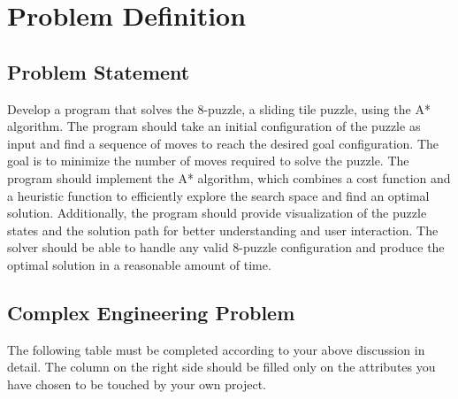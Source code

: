 \documentclass[12pt]{report}
\begin{document}
\section{Problem Definition}

\subsection{Problem Statement}
Develop a program that solves the 8-puzzle, a sliding tile puzzle, using the A* algorithm. The program should take an initial configuration of the puzzle as input and find a sequence of moves to reach the desired goal configuration. The goal is to minimize the number of moves required to solve the puzzle. The program should implement the A* algorithm, which combines a cost function and a heuristic function to efficiently explore the search space and find an optimal solution. Additionally, the program should provide visualization of the puzzle states and the solution path for better understanding and user interaction. The solver should be able to handle any valid 8-puzzle configuration and produce the optimal solution in a reasonable amount of time.

\subsection{Complex Engineering Problem}
The following table must be completed according to your above discussion in detail. The column on the right side should be filled only on the attributes you have chosen to be touched by your own project.
\end{document}
